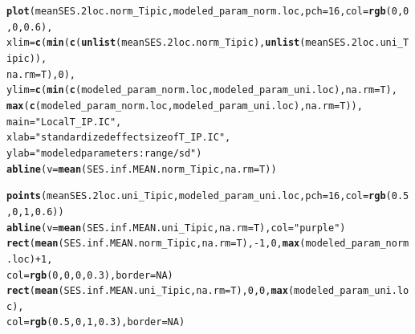 \documentclass[12pt]{article}\usepackage[]{graphicx}\usepackage[]{color}
\makeatletter
\newcommand{\hlnum}[1]{\textcolor[rgb]{0.686,0.059,0.569}{#1}}%
\newcommand{\hlstr}[1]{\textcolor[rgb]{0.192,0.494,0.8}{#1}}%
\newcommand{\hlopt}[1]{\textcolor[rgb]{0,0,0}{#1}}%
\newcommand{\hlstd}[1]{\textcolor[rgb]{0.345,0.345,0.345}{#1}}%
\newcommand{\hlkwc}[1]{\textcolor[rgb]{0.333,0.667,0.333}{#1}}%
\newcommand{\hlkwd}[1]{\textcolor[rgb]{0.737,0.353,0.396}{\textbf{#1}}}%
\newenvironment{kframe}{%
 \def\at@end@of@kframe{}%
 \ifinner\ifhmode%
  \def\at@end@of@kframe{\end{minipage}}%
  \begin{minipage}{\columnwidth}%
 \fi\fi%
 \def\FrameCommand##1{\hskip\@totalleftmargin \hskip-\fboxsep
 \colorbox{shadecolor}{##1}\hskip-\fboxsep
     \hskip-\linewidth \hskip-\@totalleftmargin \hskip\columnwidth}%
 \MakeFramed {\advance\hsize-\width
   \@totalleftmargin\z@ \linewidth\hsize
   \@setminipage}}%
 {\par\unskip\endMakeFramed%
 \at@end@of@kframe}
\newenvironment{knitrout}{}{} %
\makeatother
\begin{document}
\begin{knitrout}\small
{}\color{fgcolor}\begin{kframe}
\begin{alltt}
\hlkwd{plot}\hlstd{(meanSES.2loc.norm_Tipic, modeled_param_norm.loc,} \hlkwc{pch} \hlstd{=} \hlnum{16}\hlstd{,} \hlkwc{col} \hlstd{=} \hlkwd{rgb}\hlstd{(}\hlnum{0}\hlstd{,} \hlnum{0}\hlstd{,} \hlnum{0}\hlstd{,} \hlnum{0.6}\hlstd{),}
     \hlkwc{xlim} \hlstd{=} \hlkwd{c}\hlstd{(}\hlkwd{min}\hlstd{(}\hlkwd{c}\hlstd{(}\hlkwd{unlist}\hlstd{(meanSES.2loc.norm_Tipic),} \hlkwd{unlist}\hlstd{(meanSES.2loc.uni_Tipic)),}
              \hlkwc{na.rm} \hlstd{= T),} \hlnum{0}\hlstd{),}
     \hlkwc{ylim} \hlstd{=} \hlkwd{c}\hlstd{(}\hlkwd{min}\hlstd{(}\hlkwd{c}\hlstd{(modeled_param_norm.loc, modeled_param_uni.loc),} \hlkwc{na.rm} \hlstd{= T),}
              \hlkwd{max}\hlstd{(}\hlkwd{c}\hlstd{(modeled_param_norm.loc, modeled_param_uni.loc),} \hlkwc{na.rm} \hlstd{= T)),}
     \hlkwc{main} \hlstd{=} \hlstr{"Local T_IP.IC"}\hlstd{,}
     \hlkwc{xlab} \hlstd{=} \hlstr{"standardized effect size of T_IP.IC"}\hlstd{,}
     \hlkwc{ylab} \hlstd{=} \hlstr{"modeled parameters: range/sd"}\hlstd{)}
\hlkwd{abline}\hlstd{(}\hlkwc{v} \hlstd{=} \hlkwd{mean}\hlstd{(SES.inf.MEAN.norm_Tipic,} \hlkwc{na.rm} \hlstd{= T))}

\hlkwd{points}\hlstd{(meanSES.2loc.uni_Tipic, modeled_param_uni.loc,} \hlkwc{pch} \hlstd{=} \hlnum{16}\hlstd{,} \hlkwc{col} \hlstd{=} \hlkwd{rgb}\hlstd{(}\hlnum{0.5}\hlstd{,} \hlnum{0}\hlstd{,} \hlnum{1}\hlstd{,} \hlnum{0.6}\hlstd{))}
\hlkwd{abline}\hlstd{(}\hlkwc{v} \hlstd{=} \hlkwd{mean}\hlstd{(SES.inf.MEAN.uni_Tipic,} \hlkwc{na.rm} \hlstd{= T),} \hlkwc{col} \hlstd{=} \hlstr{"purple"}\hlstd{)}
\hlkwd{rect}\hlstd{(}\hlkwd{mean}\hlstd{(SES.inf.MEAN.norm_Tipic,} \hlkwc{na.rm} \hlstd{= T),} \hlopt{-}\hlnum{1}\hlstd{,} \hlnum{0}\hlstd{,} \hlkwd{max}\hlstd{(modeled_param_norm.loc)} \hlopt{+} \hlnum{1}\hlstd{,}
     \hlkwc{col} \hlstd{=} \hlkwd{rgb}\hlstd{(}\hlnum{0}\hlstd{,} \hlnum{0}\hlstd{,} \hlnum{0}\hlstd{,} \hlnum{0.3}\hlstd{),} \hlkwc{border} \hlstd{=} \hlnum{NA}\hlstd{)}
\hlkwd{rect}\hlstd{(}\hlkwd{mean}\hlstd{(SES.inf.MEAN.uni_Tipic,} \hlkwc{na.rm} \hlstd{= T),} \hlnum{0}\hlstd{,} \hlnum{0}\hlstd{,} \hlkwd{max}\hlstd{(modeled_param_uni.loc),}
     \hlkwc{col} \hlstd{=} \hlkwd{rgb}\hlstd{(}\hlnum{0.5}\hlstd{,} \hlnum{0}\hlstd{,} \hlnum{1}\hlstd{,} \hlnum{0.3}\hlstd{),} \hlkwc{border} \hlstd{=} \hlnum{NA}\hlstd{)}
\end{alltt}
\end{kframe}\begin{figure}


\end{figure}
\end{knitrout}
\end{document}
